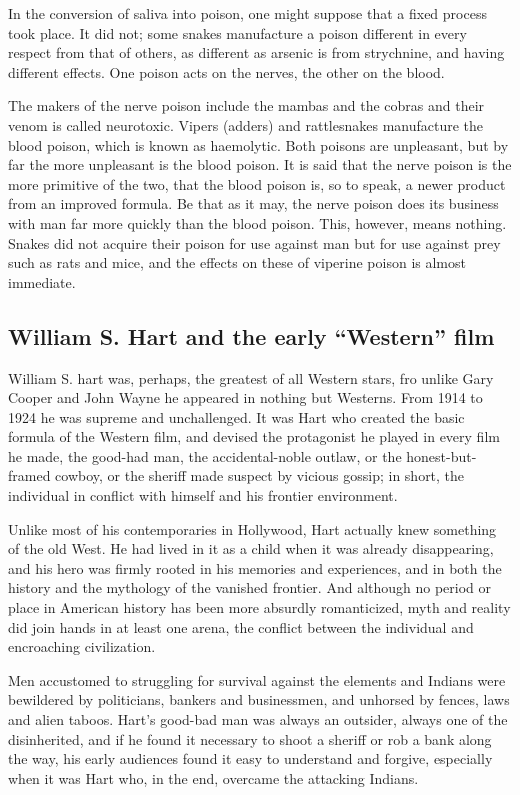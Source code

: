 \documentclass[11pt]{article}
\begin{document}
In the conversion of saliva into poison, one might suppose that a fixed process took place. It did not; some snakes manufacture a poison different in every respect from that of others, as different as arsenic is from strychnine, and having different effects. One poison acts on the nerves, the other on the blood.

The makers of the nerve poison include the mambas and the cobras and their venom is called neurotoxic. Vipers (adders) and rattlesnakes manufacture the blood poison, which is known as haemolytic. Both poisons are unpleasant, but by far the more unpleasant is the blood poison. It is said that the nerve poison is the more primitive of the two, that the blood poison is, so to speak, a newer product from an improved formula. Be that as it may, the nerve poison does its business with man far more quickly than the blood poison. This, however, means nothing. Snakes did not acquire their poison for use against man but for use against prey such as rats and mice, and the effects on these of viperine poison is almost immediate.
\subsection{William S. Hart and the early ``Western'' film}
\label{sec-2-21}

William S. hart was, perhaps, the greatest of all Western stars, fro unlike Gary Cooper and John Wayne he appeared in nothing but Westerns. From 1914 to 1924 he was supreme and unchallenged. It was Hart who created the basic formula of the Western film, and devised the protagonist he played in every film he made, the good-had man, the accidental-noble outlaw, or the honest-but-framed cowboy, or the sheriff made suspect by vicious gossip; in short, the individual in conflict with himself and his frontier environment.

Unlike most of his contemporaries in Hollywood, Hart actually knew something of the old West. He had lived in it as a child when it was already disappearing, and his hero was firmly rooted in his memories and experiences, and in both the history and the mythology of the vanished frontier. And although no period or place in American history has been more absurdly romanticized, myth and reality did join hands in at least one arena, the conflict between the individual and encroaching civilization.

Men accustomed to struggling for survival against the elements and Indians were bewildered by politicians, bankers and businessmen, and unhorsed by fences, laws and alien taboos. Hart's good-bad man was always an outsider, always one of the disinherited, and if he found it necessary to shoot a sheriff or rob a bank along the way, his early audiences found it easy to understand and forgive, especially when it was Hart who, in the end, overcame the attacking Indians.
\end{document}
